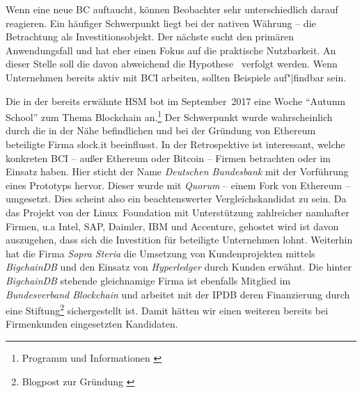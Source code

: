 

Wenn eine neue \gls{BC} auftaucht, können Beobachter sehr unterschiedlich darauf reagieren.
Ein häufiger Schwerpunkt liegt bei der nativen Währung -- die Betrachtung als Investitionsobjekt.
Der nächste sucht den primären Anwendungsfall und hat eher einen Fokus auf die praktische Nutzbarkeit.
An dieser Stelle soll die davon abweichend die Hypothese~ verfolgt werden.
Wenn Unternehmen bereits aktiv mit \gls{BCI} arbeiten, sollten Beispiele auf"|findbar sein.

Die in der  bereits erwähnte \gls{HSM} bot im September~2017 eine Woche \enquote{Autumn School} zum Thema Blockchain an.\footnote{Programm und Informationen \autocite{w:hsmw-bccm-as}}
Der Schwerpunkt wurde wahrscheinlich durch die in der Nähe befindlichen und bei der Gründung von Ethereum beteiligte Firma \mbox{slock.it} beeinflusst.
In der Retrospektive ist interessant, welche konkreten \gls{BCI} -- außer Ethereum oder Bitcoin -- Firmen betrachten oder im Einsatz haben.
Hier sticht der Name \emph{Deutschen Bundesbank} mit der Vorführung eines Prototyps hervor.
Dieser wurde mit \emph{Quorum} -- einem Fork von Ethereum -- umgesetzt. Dies scheint also ein beachtenswerter Vergleichskandidat zu sein.
Da das Projekt von der \mbox{Linux Foundation} mit Unterstützung zahlreicher namhafter Firmen, u.a Intel, SAP, Daimler, IBM und Accenture, gehostet wird ist davon auszugehen, dass sich die Investition für beteiligte Unternehmen lohnt.
Weiterhin hat die Firma \emph{Sopra Steria} die Umsetzung von Kundenprojekten mittels \emph{BigchainDB} und den Einsatz von \emph{Hyperledger} durch Kunden erwähnt.
Die hinter \emph{BigchainDB} stehende gleichnamige Firma ist ebenfalls Mitglied im \emph{Bundesverband Blockchain} und arbeitet mit der \gls{IPDB} deren Finanzierung durch eine Stiftung\footnote{Blogpost zur Gründung \autocite{w:ipdb-foundation}} sichergestellt ist.
Damit hätten wir einen weiteren bereits bei Firmenkunden eingesetzten Kandidaten.


